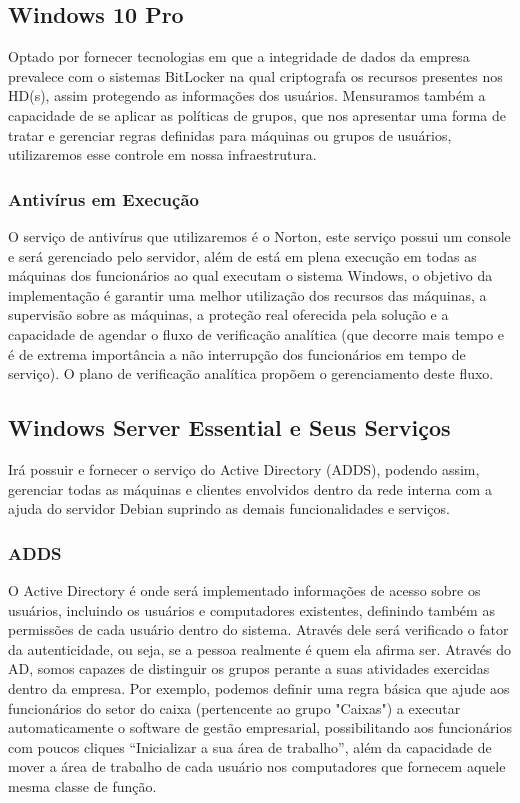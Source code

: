 \documentclass[12pt]{article}
\begin{document}
\subsection{Windows 10 Pro}
Optado por fornecer tecnologias em que a integridade de dados da empresa prevalece com o sistemas BitLocker na qual criptografa os recursos presentes nos HD(s), assim protegendo as informações dos usuários. Mensuramos também a capacidade de se aplicar as políticas de grupos, que nos apresentar uma forma de tratar e gerenciar regras definidas para máquinas ou grupos de usuários, utilizaremos esse controle em nossa infraestrutura.

\subsubsection{Antivírus em Execução}
O serviço de antivírus que utilizaremos é o Norton, este serviço possui um console e será gerenciado pelo servidor, além de está em plena execução em todas as máquinas dos funcionários ao qual executam o sistema Windows, o objetivo da implementação é garantir uma melhor utilização dos recursos das máquinas, a supervisão sobre as máquinas, a proteção real oferecida pela solução e a capacidade de agendar o fluxo de verificação analítica (que decorre mais tempo e é de extrema importância a não interrupção dos funcionários em tempo de serviço). O plano de verificação analítica propõem o gerenciamento deste fluxo.

\subsection{Windows Server Essential e Seus Serviços}
Irá possuir e fornecer o serviço do Active Directory (ADDS), podendo assim, gerenciar todas as máquinas e clientes envolvidos dentro da rede interna com a ajuda do servidor Debian suprindo as demais funcionalidades e serviços.

\subsubsection{ADDS}
O Active Directory é onde será implementado informações de acesso sobre os usuários, incluindo os usuários e computadores existentes, definindo também as permissões de cada usuário dentro do sistema. Através dele será verificado o fator da autenticidade, ou seja, se a pessoa realmente é quem ela afirma ser.\newline 
Através do AD, somos capazes de distinguir os grupos perante a suas atividades exercidas dentro da empresa. Por exemplo, podemos definir uma regra básica que ajude aos funcionários do setor do caixa (pertencente ao grupo "Caixas") a executar automaticamente o software de gestão empresarial, possibilitando aos funcionários com poucos cliques “Inicializar a sua área de trabalho”, além da capacidade de mover a área de trabalho de cada usuário nos computadores que fornecem aquele mesma classe de função.
\end{document}
